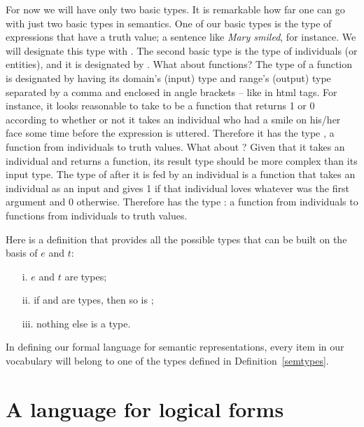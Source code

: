 \documentclass[11pt,a4paper]{article}
\begin{document}
For now we will have only two basic types. It is remarkable how far one can go with just two basic types in semantics. One of our basic types is the type of expressions that have a truth value; a sentence like \emph{Mary smiled}, for instance. We will designate this type with . The second basic type is the type of individuals (or entities), and it is designated by . What about functions? The type of a function is designated by having its domain's (input) type and range's (output) type separated by a comma and enclosed in angle brackets -- like in html tags. For instance, it looks reasonable to take  to be a function that returns 1 or 0 according to whether or not it takes an individual who had a smile on his/her face some time before the expression is uttered. Therefore it has the type , a function from individuals to truth values. What about ? Given that it takes an individual and returns a function, its result type should be more complex than its input type. The type of  after it is fed by an individual is a function that takes an individual as an input and gives 1 if that individual loves whatever was the first argument and 0 otherwise. Therefore  has the type : a function from individuals to functions from individuals to truth values.

Here is a definition that provides all the possible types that can be built on the basis of $e$ and $t$:

\begin{udefinition}\label{semtypes}
\begin{enumerate}
\item[]
\item[i.] $e$ and $t$ are types; 
\item[ii.] if \sysm{\alpha} and \sysm{\beta} are types, then so is \smtyp{\alpha}{\beta}; 
\item[iii.]  nothing else is a type.
\end{enumerate}
\end{udefinition}

In defining our formal language for semantic representations, every item in our vocabulary will belong to one of the types defined in Definition~\ref{semtypes}.

\section{A language for logical forms}
\end{document}
